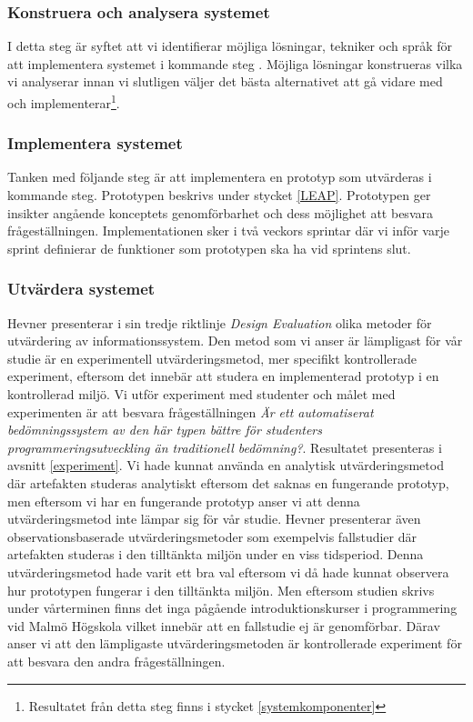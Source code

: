 \documentclass[a4paper,11pt]{article}
\begin{document}
{\subsubsection*{Konstruera och analysera systemet}

I detta steg är syftet att vi identifierar möjliga lösningar, tekniker och språk för att implementera systemet i kommande steg \cite{nunamaker}. Möjliga lösningar konstrueras vilka vi analyserar innan vi slutligen väljer det bästa alternativet att gå vidare med och implementerar\footnote{Resultatet från detta steg finns i stycket \ref{systemkomponenter}}.

\subsubsection*{Implementera systemet}

Tanken med följande steg är att implementera en prototyp som utvärderas i kommande steg. Prototypen beskrivs under stycket \ref{LEAP}. Prototypen ger insikter angående konceptets genomförbarhet och dess möjlighet att besvara frågeställningen. Implementationen sker i två veckors sprintar där vi inför varje sprint definierar de funktioner som prototypen ska ha vid sprintens slut.

\subsubsection*{Utvärdera systemet}

Hevner \cite{hevner} presenterar i sin tredje riktlinje \textit{Design Evaluation} olika metoder för utvärdering av informationssystem. Den metod som vi anser är lämpligast för vår studie är en experimentell utvärderingsmetod, mer specifikt kontrollerade experiment, eftersom det innebär att studera en implementerad prototyp i en kontrollerad miljö. Vi utför experiment med studenter och målet med experimenten är att besvara frågeställningen \textit{Är ett automatiserat bedömningssystem av den här typen bättre för studenters programmeringsutveckling än traditionell bedömning?}. Resultatet presenteras i avsnitt \ref{experiment}. 
Vi hade kunnat använda en analytisk utvärderingsmetod där artefakten studeras analytiskt eftersom det saknas en fungerande prototyp, men eftersom vi har en fungerande prototyp anser vi att denna utvärderingsmetod inte lämpar sig för vår studie.
Hevner presenterar även observationsbaserade utvärderingsmetoder som exempelvis fallstudier där artefakten studeras i den tilltänkta miljön under en viss tidsperiod. Denna utvärderingsmetod hade varit ett bra val eftersom vi då hade kunnat observera hur prototypen fungerar i den tilltänkta miljön. Men eftersom studien skrivs under vårterminen finns det inga pågående introduktionskurser i programmering vid Malmö Högskola vilket innebär att en fallstudie ej är genomförbar. Därav anser vi att den lämpligaste utvärderingsmetoden är kontrollerade experiment för att besvara den andra frågeställningen.

}
\end{document}
